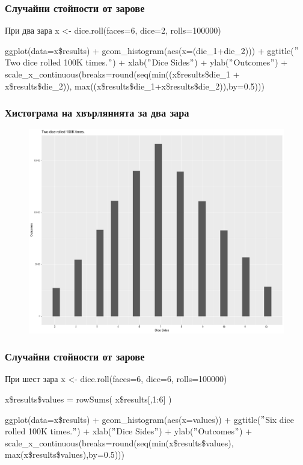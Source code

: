 \documentclass{beamer}
\begin{document}
\begin{frame}
\frametitle{Случайни стойности от зарове}
\begin{block}{При два зара}
x <- dice.roll(faces=6, dice=2, rolls=100000)

ggplot(data=x\$results) + geom\_histogram(aes(x=(die\_1+die\_2))) + ggtitle($"$Two dice rolled 100K times.$"$) + xlab($"$Dice Sides$"$) + ylab($"$Outcomes$"$) + scale\_x\_continuous(breaks=round(seq(min((x\$results\$die\_1 + x\$results\$die\_2)), max((x\$results\$die\_1+x\$results\$die\_2)),by=0.5)))
\end{block}
\end{frame}

\begin{frame}
\frametitle{Хистограма на хвърлянията за два зара}
\begin{figure}[]\includegraphics[width=\textwidth,height=0.75\textheight]{pic0048}\end{figure}
\end{frame}

\begin{frame}
\frametitle{Случайни стойности от зарове}
\begin{block}{При шест зара}
x <- dice.roll(faces=6, dice=6, rolls=100000)

x\$results\$values = rowSums( x\$results[,1:6] )

ggplot(data=x\$results) + geom\_histogram(aes(x=values)) + ggtitle($"$Six dice rolled 100K times.$"$) + xlab($"$Dice Sides$"$) + ylab($"$Outcomes$"$) + scale\_x\_continuous(breaks=round(seq(min(x\$results\$values), max(x\$results\$values),by=0.5)))
\end{block}
\end{frame}
\end{document}
